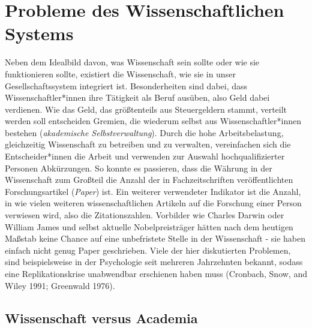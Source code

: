 \documentclass[
  letterpaper,
  DIV=11,
  numbers=noendperiod]{scrreprt}
\begin{document}
\section{Probleme des Wissenschaftlichen
Systems}\label{probleme-des-wissenschaftlichen-systems}

Neben dem Idealbild davon, was Wissenschaft sein sollte oder wie sie
funktionieren sollte, existiert die Wissenschaft, wie sie in unser
Gesellschaftssystem integriert ist. Besonderheiten sind dabei, dass
Wissenschaftler*innen ihre Tätigkeit als Beruf ausüben, also Geld dabei
verdienen. Wie das Geld, das größtenteils aus Steuergeldern stammt,
verteilt werden soll entscheiden Gremien, die wiederum selbst aus
Wissenschaftler*innen bestehen (\emph{akademische Selbstverwaltung}).
Durch die hohe Arbeitsbelastung, gleichzeitig Wissenschaft zu betreiben
und zu verwalten, vereinfachen sich die Entscheider*innen die Arbeit und
verwenden zur Auswahl hochqualifizierter Personen Abkürzungen. So konnte
es passieren, dass die Währung in der Wissenschaft zum Großteil die
Anzahl der in Fachzeitschriften veröffentlichten Forschungsartikel
(\emph{Paper}) ist. Ein weiterer verwendeter Indikator ist die Anzahl,
in wie vielen weiteren wissenschaftlichen Artikeln auf die Forschung
einer Person verwiesen wird, also die Zitationszahlen. Vorbilder wie
Charles Darwin oder William James und selbst aktuelle Nobelpreisträger
hätten nach dem heutigen Maßstab keine Chance auf eine unbefristete
Stelle in der Wissenschaft - sie haben einfach nicht genug Paper
geschrieben. Viele der hier diskutierten Problemen, sind beispielsweise
in der Psychologie seit mehreren Jahrzehnten bekannt, sodass eine
Replikationskrise unabwendbar erschienen haben muss (Cronbach, Snow, and
Wiley 1991; Greenwald 1976).

\subsection{Wissenschaft versus
Academia}\label{wissenschaft-versus-academia}
\end{document}
